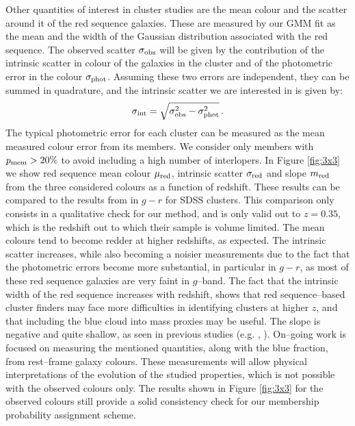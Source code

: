 {Other quantities of interest in cluster studies are the mean colour and the scatter around it of the red sequence galaxies. These are measured by our GMM fit as the mean and the width of the Gaussian distribution associated with the red sequence. The observed scatter $\sigma_{\rm obs}$ will be given by the contribution of the intrinsic scatter in colour of the galaxies in the cluster and of the photometric error in the colour $\sigma_{\rm phot}$. Assuming these two errors are independent, they can be summed in quadrature, and the intrinsic scatter we are interested in is given by:
\begin{equation}
\sigma_{\rm int} =\sqrt{\sigma^2_{\rm obs}-\sigma^2_{\rm phot}}\,.
\end{equation}
The typical photometric error for each cluster can be measured as the mean measured colour error from its members. We consider only members with $p_{\rm mem}>20\%$ to avoid including a high number of interlopers. In Figure \ref{fig:3x3} we show red sequence mean colour $\mu_{\rm red}$, intrinsic scatter $\sigma_{\rm red}$ and slope $m_{\rm red}$ from the three considered colours as a function of redshift. These results can be compared to the results from \citet{redpaper} in $g-r$ for SDSS clusters. This comparison only consists in a qualitative check for our method, and is only valid out to $z=0.35$, which is the redshift out to which their sample is volume limited. The mean colours tend to become redder at higher redshifts, as expected. The intrinsic scatter increases, while also becoming a noisier measurements due to the fact that the photometric errors become more substantial, in particular in $g-r$, as most of these red sequence galaxies are very faint in $g$--band.  The fact that the intrinsic width of the red sequence increases with redshift, shows that red sequence--based cluster finders may face more difficulties in identifying clusters at higher $z$, and that including the blue cloud into mass proxies may be useful. The slope is negative and quite shallow, as seen in previous studies (e.g. \citealt{mei}, \citealt{redpaper}).
On--going work is focused on measuring the mentioned quantities, along with the blue fraction, from rest--frame galaxy colours. These measurements will allow physical interpretations of the evolution of the studied properties, which is not possible with the observed colours only. The results shown in Figure \ref{fig:3x3} for the observed colours still provide a solid consistency check for our membership probability assignment scheme. %


}
